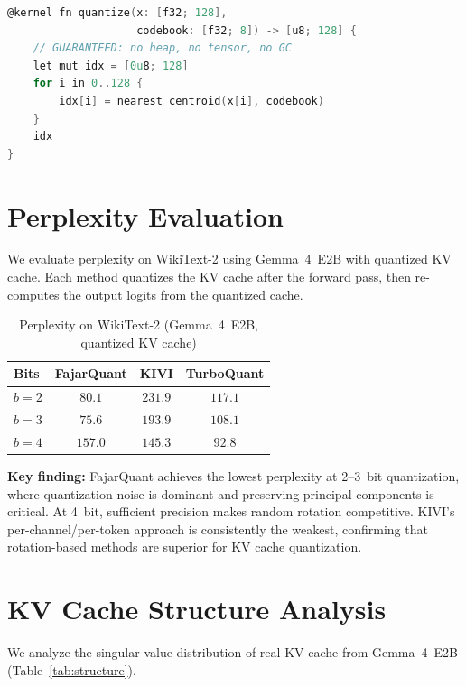 \documentclass[10pt,twocolumn]{article}
\begin{document}
\begin{lstlisting}[language=C,caption={@kernel ensures allocation-free quantization}]
@kernel fn quantize(x: [f32; 128],
                    codebook: [f32; 8]) -> [u8; 128] {
    // GUARANTEED: no heap, no tensor, no GC
    let mut idx = [0u8; 128]
    for i in 0..128 {
        idx[i] = nearest_centroid(x[i], codebook)
    }
    idx
}
\end{lstlisting}

\section{Perplexity Evaluation}

We evaluate perplexity on WikiText-2 using Gemma~4~E2B with quantized KV cache. Each method quantizes the KV cache after the forward pass, then re-computes the output logits from the quantized cache.

\begin{table}[t]
\centering
\caption{Perplexity on WikiText-2 (Gemma~4~E2B, quantized KV cache)}
\label{tab:ppl}
\begin{tabular}{lccc}
\toprule
Bits & FajarQuant & KIVI & TurboQuant \\
\midrule
$b{=}2$ & $\mathbf{80.1}$ & $231.9$ & $117.1$ \\
$b{=}3$ & $\mathbf{75.6}$ & $193.9$ & $108.1$ \\
$b{=}4$ & $157.0$ & $145.3$ & $\mathbf{92.8}$ \\
\bottomrule
\end{tabular}
\end{table}

\textbf{Key finding:} FajarQuant achieves the lowest perplexity at 2--3~bit quantization, where quantization noise is dominant and preserving principal components is critical. At 4~bit, sufficient precision makes random rotation competitive. KIVI's per-channel/per-token approach is consistently the weakest, confirming that rotation-based methods are superior for KV cache quantization.

\section{KV Cache Structure Analysis}

We analyze the singular value distribution of real KV cache from Gemma~4~E2B (Table~\ref{tab:structure}).
\end{document}
